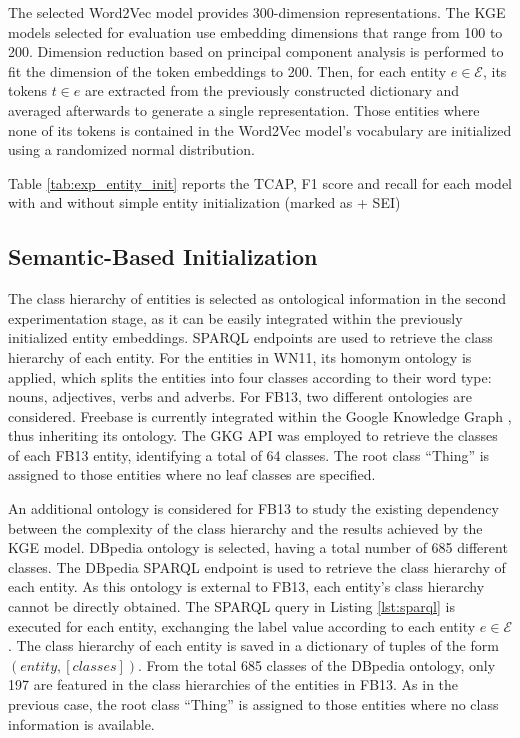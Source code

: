 The selected Word2Vec model provides 300-dimension representations. The KGE models selected for evaluation use embedding dimensions that range from 100 to 200. Dimension reduction based on principal component analysis is performed to fit the dimension of the token embeddings to 200. Then, for each entity $e \in \mathcal{E}$, its tokens $t \in e$ are extracted from the previously constructed dictionary and averaged afterwards to generate a single representation. Those entities where none of its tokens is contained in the Word2Vec model's vocabulary are initialized using a randomized normal distribution.

Table \ref{tab:exp_entity_init} reports the TCAP, F1 score and recall for each model with and without simple entity initialization (marked as + SEI)

\subsection{Semantic-Based Initialization}
The class hierarchy of entities is selected as ontological information in the second experimentation stage, as it can be easily integrated within the previously initialized entity embeddings. SPARQL endpoints are used to retrieve the class hierarchy of each entity. For the entities in WN11, its homonym ontology is applied, which splits the entities into four classes according to their word type: nouns, adjectives, verbs and adverbs. For FB13, two different ontologies are considered. Freebase is currently integrated within the Google Knowledge Graph \citep{GKG_ont}, thus inheriting its ontology. The GKG API was employed to retrieve the classes of each FB13 entity, identifying a total of 64 classes. The root class ``Thing'' is assigned to those entities where no leaf classes are specified.

An additional ontology is considered for FB13 to study the existing dependency between the complexity of the class hierarchy and the results achieved by the KGE model. DBpedia ontology \citep{DB_ont} is selected, having a total number of 685 different classes. The DBpedia SPARQL endpoint is used to retrieve the class hierarchy of each entity. As this ontology is external to FB13, each entity's class hierarchy cannot be directly obtained. The SPARQL query in Listing \ref{lst:sparql} is executed for each entity, exchanging the label value according to each entity $e \in \mathcal{E}$. The class hierarchy of each entity is saved in a dictionary of tuples of the form $(entity, [classes])$. From the total 685 classes of the DBpedia ontology, only 197 are featured in the class hierarchies of the entities in FB13. As in the previous case, the root class ``Thing'' is assigned to those entities where no class information is available.

